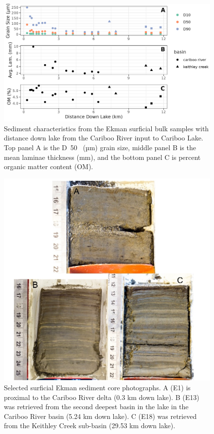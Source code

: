 \documentclass[Royal,times,doublespace,sageh]{sagej}
\begin{document}
\begin{figure}

{\centering \includegraphics[width=1\linewidth]{figs/ekman_seds} 

}

\caption{Sediment characteristics from the Ekman surficial bulk samples with distance down lake from the Cariboo River input to Cariboo Lake. Top panel A is the D~50~ (µm) grain size, middle panel B is the mean laminae thickness (mm), and the bottom panel C is percent organic matter content (OM).}\label{fig:ekmanSeds}
\end{figure}

\begin{figure}

{\centering \includegraphics[width=1\linewidth]{figs/ekman_example} 

}

\caption{Selected surficial Ekman sediment core photographs. A (E1) is proximal to the Cariboo River delta (0.3 km down lake). B (E13) was retrieved from the second deepest basin in the lake in the Cariboo River basin (5.24 km down lake). C (E18) was retrieved from the Keithley Creek sub-basin (29.53 km down lake).}\label{fig:ekmanImgs}
\end{figure}
\end{document}
